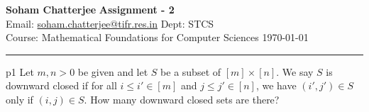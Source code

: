 \documentclass[a4paper, 11pt]{article}
\begin{document}
	
	
	{\noindent \large\textbf{Soham Chatterjee} \hfill \textbf{Assignment - 2}\\
		Email: \href{soham.chatterjee@tifr.res.in}{soham.chatterjee@tifr.res.in} \hfill Dept: STCS\\
		\normalsize Course: Mathematical Foundations for Computer Sciences \hfill \today\\ 
		\noindent\rule{7in}{2.8pt}}
	
	
\begin{problem}{%
	}{p1%
}
Let $m,n>0$ be given and let $S$ be a subset of $[m]\times [n]$. We say $S$ is downward closed if for all $i\leq i'\in [m]$ and $j\leq j'\in [n]$, we have $(i',j')\in S$ only if $(i,j)\in S$. How many downward closed sets are there?
\end{problem}
\solve{

}
\end{document}
